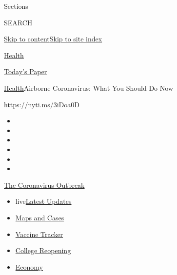 Sections

SEARCH

\protect\hyperlink{site-content}{Skip to
content}\protect\hyperlink{site-index}{Skip to site index}

\href{https://www.nytimes.com/section/health}{Health}

\href{https://myaccount.nytimes.com/auth/login?response_type=cookie\&client_id=vi}{}

\href{https://www.nytimes.com/section/todayspaper}{Today's Paper}

\href{/section/health}{Health}\textbar{}Airborne Coronavirus: What You
Should Do Now

\url{https://nyti.ms/3iDoa0D}

\begin{itemize}
\item
\item
\item
\item
\item
\item
\end{itemize}

\href{https://www.nytimes.com/news-event/coronavirus?action=click\&pgtype=Article\&state=default\&region=TOP_BANNER\&context=storylines_menu}{The
Coronavirus Outbreak}

\begin{itemize}
\tightlist
\item
  live\href{https://www.nytimes.com/2020/08/04/world/coronavirus-cases.html?action=click\&pgtype=Article\&state=default\&region=TOP_BANNER\&context=storylines_menu}{Latest
  Updates}
\item
  \href{https://www.nytimes.com/interactive/2020/us/coronavirus-us-cases.html?action=click\&pgtype=Article\&state=default\&region=TOP_BANNER\&context=storylines_menu}{Maps
  and Cases}
\item
  \href{https://www.nytimes.com/interactive/2020/science/coronavirus-vaccine-tracker.html?action=click\&pgtype=Article\&state=default\&region=TOP_BANNER\&context=storylines_menu}{Vaccine
  Tracker}
\item
  \href{https://www.nytimes.com/2020/08/02/us/covid-college-reopening.html?action=click\&pgtype=Article\&state=default\&region=TOP_BANNER\&context=storylines_menu}{College
  Reopening}
\item
  \href{https://www.nytimes.com/live/2020/08/04/business/stock-market-today-coronavirus?action=click\&pgtype=Article\&state=default\&region=TOP_BANNER\&context=storylines_menu}{Economy}
\end{itemize}

